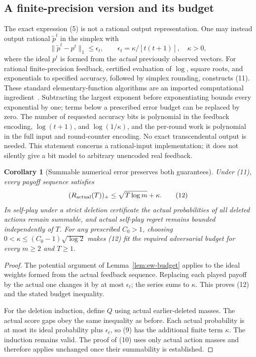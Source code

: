 \documentclass[11pt]{article}
\newtheorem{corollary}{Corollary}
\theoremstyle{definition}
\theoremstyle{remark}
\begin{document}
\subsection{A finite-precision version and its budget}
The exact expression (5) is not a rational output representation. One may
instead output rational $\widetilde p^t$ in the simplex with
\[
 \|\widetilde p^t-p^t\|_1\leq\epsilon_t,
 \qquad \epsilon_t=\kappa/[t(t+1)],\quad\kappa>0,       \tag{11}
\]
where the ideal $p^t$ is formed from the \emph{actual} previously observed
vectors. For rational finite-precision feedback, certified evaluation of
$\log$, square roots, and exponentials to specified accuracy, followed by
simplex rounding, constructs (11). These standard elementary-function
algorithms are an imported computational ingredient~\cite{BZ}. Subtracting
the largest exponent before exponentiating bounds every exponential by
one; terms below a prescribed error budget can be replaced by zero. The
number of requested accuracy bits is polynomial in the feedback encoding,
$\log(t+1)$, and $\log(1/\kappa)$, and the per-round work is polynomial in
the full input and round-counter encoding. No exact transcendental output
is needed. This statement concerns a rational-input implementation; it does
not silently give a bit model to arbitrary unencoded real feedback.

\begin{corollary}[Summable numerical error preserves both guarantees]
Under (11), every payoff sequence satisfies
\[
 (R_{\rm actual}(T))_+\leq\sqrt{T\log m}+\kappa.       \tag{12}
\]
In self-play under a strict deletion certificate the actual probabilities
of all deleted actions remain summable, and actual self-play regret remains
bounded independently of $T$. For any prescribed $C_0>1$, choosing
$0<\kappa\leq(C_0-1)\sqrt{\log2}$ makes (12) fit the required adversarial
budget for every $m\geq2$ and $T\geq1$.
\end{corollary}
\begin{proof}
The potential argument of Lemma~\ref{lem:ew-budget} applies to the ideal
weights formed from the actual feedback sequence. Replacing each played
payoff by the actual one changes it by at most $\epsilon_t$; the series
sums to $\kappa$. This proves (12) and the stated budget inequality.

For the deletion induction, define $Q$ using actual earlier-deleted masses.
The actual score gaps obey the same inequality as before. Each actual
probability is at most its ideal probability plus $\epsilon_t$, so (9)
has the additional finite term $\kappa$. The induction remains valid.
The proof of (10) uses only actual action masses and therefore applies
unchanged once their summability is established.
\end{proof}
\end{document}
